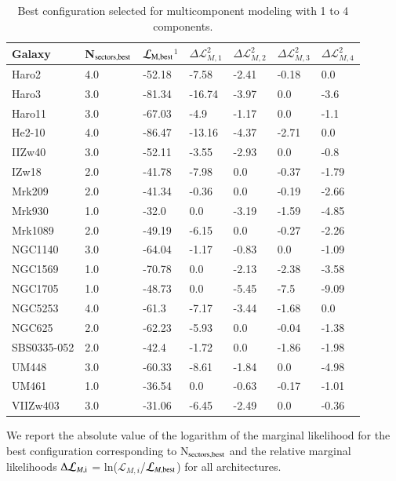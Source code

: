 \documentclass{aa}
\begin{document}
\begin{appendix}
\begin{table}[h!]
\centering
\label{table_lm}
\begin{threeparttable}
\caption[Best configuration selected for multicomponent modeling with 1 to 4 components.]{Best configuration selected for multicomponent modeling with 1 to 4 components.} 
\label{table_lm}
\begin{tabular}{|p{}|p{}|p{}|p{}|p{}|p{}|p{}|}
\hline
Galaxy & N$_{\rm sectors, best}$ & $\mathcal{L}_{\rm M,best}$$^{1}$ & $\Delta \mathcal{L}_{M,1}^{2}$ & $\Delta \mathcal{L}_{M,2}^{2}$& $\Delta \mathcal{L}_{M,3}^{2}$& $\Delta \mathcal{L}_{M,4}^{2}$  \\ \hline 
Haro2&4.0&-52.18&-7.58&-2.41&-0.18&0.0\\
Haro3&3.0&-81.34&-16.74&-3.97&0.0&-3.6\\
Haro11&3.0&-67.03&-4.9&-1.17&0.0&-1.1\\
He2-10&4.0&-86.47&-13.16&-4.37&-2.71&0.0\\
IIZw40&3.0&-52.11&-3.55&-2.93&0.0&-0.8\\
IZw18&2.0&-41.78&-7.98&0.0&-0.37&-1.79\\
Mrk209&2.0&-41.34&-0.36&0.0&-0.19&-2.66\\
Mrk930&1.0&-32.0&0.0&-3.19&-1.59&-4.85\\
Mrk1089&2.0&-49.19&-6.15&0.0&-0.27&-2.26\\
NGC1140&3.0&-64.04&-1.17&-0.83&0.0&-1.09\\
NGC1569&1.0&-70.78&0.0&-2.13&-2.38&-3.58\\
NGC1705&1.0&-48.73&0.0&-5.45&-7.5&-9.09\\
NGC5253&4.0&-61.3&-7.17&-3.44&-1.68&0.0\\
NGC625&2.0&-62.23&-5.93&0.0&-0.04&-1.38\\
SBS0335-052&2.0&-42.4&-1.72&0.0&-1.86&-1.98\\
UM448&3.0&-60.33&-8.61&-1.84&0.0&-4.98\\
UM461&1.0&-36.54&0.0&-0.63&-0.17&-1.01\\
VIIZw403&3.0&-31.06&-6.45&-2.49&0.0&-0.36\\
\hline
\end{tabular}
\begin{tablenotes}
   \footnotesize
   \item We report the absolute value of the logarithm of the marginal likelihood for the best configuration corresponding to N$_{\rm sectors, best}$ and the relative marginal likelihoods $\Delta \mathcal{L}_{M,\rm i}$ = ln($\mathcal{L}_{M, i}$/$\mathcal{L}_{M,\rm best}$) for all architectures.
\end{tablenotes}
\end{threeparttable}
\end{table}


\end{appendix}
\end{document}
